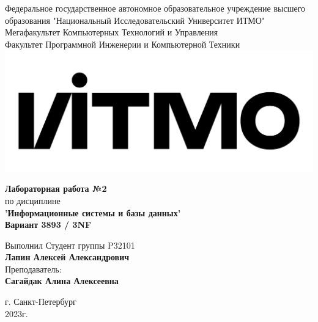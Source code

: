 \documentclass[12pt,onecolumn]{article}
\begin{document}
\setcounter{tocdepth}{4}
\begin{center}
    Федеральное государственное автономное образовательное учреждение высшего образования "Национальный Исследовательский Университет ИТМО"\\ 
    Мегафакультет Компьютерных Технологий и Управления\\
    Факультет Программной Инженерии и Компьютерной Техники \\
    \includegraphics[scale=0.3]{image/itmo.jpg} %
\end{center}
\vspace{1cm}


\begin{center}
    \textbf{Лабораторная работа №2}\\
    по дисциплине\\
    \textbf{'Информационные системы и базы данных'}\\
    \textbf{Вариант 3893 / 3NF}
\end{center}

\vspace{2cm}

\begin{flushright}
  Выполнил Студент  группы P32101\\
  \textbf{Лапин Алексей Александрович}\\
  Преподаватель: \\
  \textbf{Сагайдак Алина Алексеевна}\\
\end{flushright}

\vspace{6cm}
\begin{center}
    г. Санкт-Петербург\\
    2023г.
\end{center}

\newpage
\tableofcontents
\newpage
\end{document}
